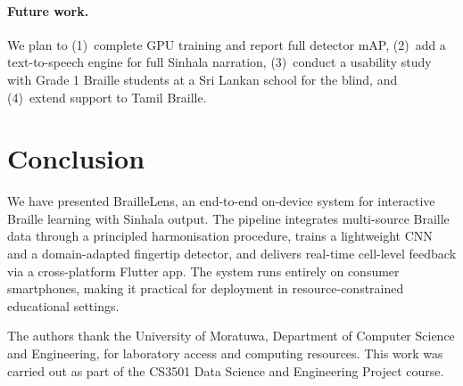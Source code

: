 \documentclass{article}
\begin{document}
\paragraph{Future work.} We plan to (1)~complete GPU training and
report full detector mAP, (2)~add a text-to-speech engine for full Sinhala
narration, (3)~conduct a usability study with Grade 1 Braille students at a
Sri Lankan school for the blind, and (4)~extend support to Tamil Braille.

\section{Conclusion}

We have presented BrailleLens, an end-to-end on-device system for
interactive Braille learning with Sinhala output.  The pipeline integrates
multi-source Braille data through a principled harmonisation procedure,
trains a lightweight CNN and a domain-adapted fingertip detector, and
delivers real-time cell-level feedback via a cross-platform Flutter app.
The system runs entirely on consumer smartphones, making it practical for
deployment in resource-constrained educational settings.

\begin{ack}
The authors thank the University of Moratuwa, Department of Computer
Science and Engineering, for laboratory access and computing resources.
This work was carried out as part of the CS3501 Data Science and
Engineering Project course.
\end{ack}

\end{document}
